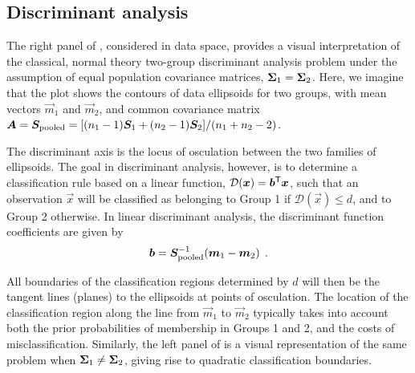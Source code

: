 \subsection{Discriminant analysis}

The right panel of , considered in data space, provides a
visual interpretation of the classical, normal theory two-group discriminant analysis problem
under the assumption of equal population covariance matrices, $\bm{\Sigma}_1 = \bm{\Sigma}_2$.
Here, we imagine that the plot shows the contours of data ellipsoids for two groups,
with mean vectors $\vec{m}_1$ and $\vec{m}_2$, and common covariance matrix
$\bm{A} = \bm{S}_{\textrm{pooled}} = [ (n_1 -1)\bm{S}_1 + (n_2 -1)\bm{S}_2 ] / (n_1 +n_2 -2) $.

The discriminant axis is the locus of osculation between the two families of ellipsoids.
The goal in discriminant analysis, however, is to determine a classification rule based on
a linear function, $\mathcal{D}(\bm{x}) = \bm{b}^\mathsf{T} \bm{x}$, such that
an observation $\vec{x}$ will be classified as belonging to Group 1 if
$\mathcal{D}(\vec{x}) \le d$, and to Group 2 otherwise.  In linear discriminant
analysis, the discriminant function coefficients are
given by
\begin{equation*}
\bm{b} = \bm{S}_{\textrm{pooled}}^{-1} ( \bm{m}_1 - \bm{m}_2 ) \:\: .
\end{equation*}

All boundaries
of the classification regions determined by $d$
will then be the tangent lines (planes) to the ellipsoids at points of osculation.
The location of the classification region along the line from $\vec{m}_1$ to $\vec{m}_2$
typically takes into account both the
prior probabilities of membership in Groups 1 and 2, and the costs of misclassification.
Similarly, the left panel of  is a visual representation of the
same problem when $\bm{\Sigma}_1 \ne \bm{\Sigma}_2$, giving rise to quadratic classification
boundaries.



